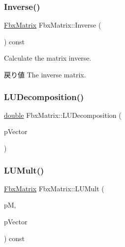 \subsubsection{\texorpdfstring{Inverse()}{Inverse()}}
{\footnotesize\ttfamily \hyperlink{class_fbx_matrix}{Fbx\+Matrix} Fbx\+Matrix\+::\+Inverse (\begin{DoxyParamCaption}{ }\end{DoxyParamCaption}) const}

Calculate the matrix inverse. \begin{DoxyReturn}{戻り値}
The inverse matrix. 
\end{DoxyReturn}
\mbox{\label{class_fbx_matrix_a54c603f422d3a39bdf0bc6c4f3e14436}} 
\subsubsection{\texorpdfstring{L\+U\+Decomposition()}{LUDecomposition()}}
{\footnotesize\ttfamily \hyperlink{class_fbx_matrix_a01f8be57393e5d9973b23897c29d5520}{double} Fbx\+Matrix\+::\+L\+U\+Decomposition (\begin{DoxyParamCaption}\item[{\hyperlink{class_fbx_vector4}{Fbx\+Vector4} \&}]{p\+Vector }\end{DoxyParamCaption})}

\mbox{\label{class_fbx_matrix_ab6757b8b980b7408507a8fe95a954872}} 
\subsubsection{\texorpdfstring{L\+U\+Mult()}{LUMult()}}
{\footnotesize\ttfamily \hyperlink{class_fbx_matrix}{Fbx\+Matrix} Fbx\+Matrix\+::\+L\+U\+Mult (\begin{DoxyParamCaption}\item[{\hyperlink{class_fbx_matrix}{Fbx\+Matrix}}]{pM,  }\item[{const \hyperlink{class_fbx_vector4}{Fbx\+Vector4} \&}]{p\+Vector }\end{DoxyParamCaption}) const}

\mbox{\label{class_fbx_matrix_a6c0d007cd876405973411e185aabe8a9}} 
